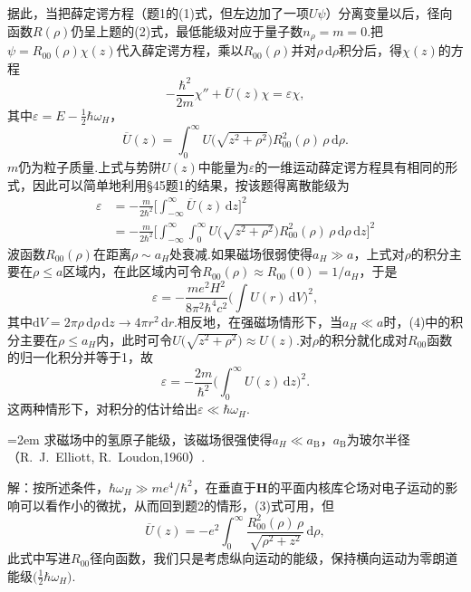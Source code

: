\begin{xiti}
据此，当把薛定谔方程（题1的(1)式，但左边加了一项$U\psi$）分离变量以后，径向函数$R(\rho)$仍呈上题的(2)式，最低能级对应于量子数$n_\rho=m=0$.把$\psi=R_{00}(\rho)\chi(z)$代入薛定谔方程，乘以$R_{00}(\rho)$并对$\rho\,\mathrm{d}\rho$积分后，得$\chi(z)$的方程
\begin{equation}
  -\frac{\hbar^2}{2m}\chi''+\overline{U}(z)\chi=\varepsilon\chi,
\end{equation}
其中$\varepsilon=E-\frac{1}{2}\hbar\omega_H$，
\begin{equation*}
  \overline{U}(z)=\int_0^{\infty}U\bigl(\sqrt{z^2+\rho^2}\bigr)R_{00}^2(\rho)\,\rho\,\mathrm{d}\rho.
\end{equation*}
$m$仍为粒子质量.上式与势阱$U(z)$中能量为$\varepsilon$的一维运动薛定谔方程具有相同的形式，因此可以简单地利用§45题1的结果，按该题得离散能级为
\begin{equation}
\begin{aligned}
  \varepsilon&=-\frac{m}{2\hbar^2}\biggl[\int_{-\infty}^{\infty}\overline{U}(z)\,\mathrm{d}z\biggr]^2\\
  &=-\frac{m}{2\hbar^2}\biggl[\int_{-\infty}^{\infty}\int_0^{\infty}
  U\bigl(\sqrt{z^2+\rho^2}\bigr)R_{00}^2(\rho)\,\rho\,\mathrm{d}\rho\,\mathrm{d}z\biggr]^2
\end{aligned}
\end{equation}
波函数$R_{00}(\rho)$在距离$\rho\sim a_H$处衰减.如果磁场很弱使得$a_H\gg a$，上式对$\rho$的积分主要在$\rho\leqslant a$区域内，在此区域内可令$R_{00}(\rho)\approx R_{00}(0)=1/a_H$，于是
\begin{equation}
  \varepsilon=-\frac{me^2H^2}{8\pi^2\hbar^4c^2}
  \biggl(\int U(r)\,\mathrm{d}V\biggr)^2,
\end{equation}
其中$\mathrm{d}V=2\pi\rho\,\mathrm{d}\rho\,\mathrm{d}z\to4\pi r^2\,\mathrm{d}r$.相反地，在强磁场情形下，当$a_H\ll a$时，(4)中的积分主要在$\rho\leqslant a_H$内，此时可令$U\bigl(\sqrt{z^2+\rho^2}\bigr)\approx U(z)$.对$\rho$的积分就化成对$R_{00}$函数的归一化积分并等于1，故
\begin{equation}
  \varepsilon=-\frac{2m}{\hbar^2}\biggl(\int_0^{\infty}U(z)\,\mathrm{d}z\biggr)^2.
\end{equation}
这两种情形下，对积分的估计给出$\varepsilon\ll\hbar\omega_H$.

\emergencystretch=2em%
\quad 求磁场中的氢原子能级，该磁场很强使得$a_H\ll a_\mathrm{B}$，$a_\mathrm{B}$为玻尔半径（R.~J.~Elliott, R.~Loudon,1960）.

解：按所述条件，$\hbar\omega_H\gg me^4/\hbar^2$，在垂直于$\boldsymbol{H}$的平面内核库仑场对电子运动的影响可以看作小的微扰，从而回到题2的情形，(3)式可用，但
\emergencystretch=0pt%
\begin{equation}
  \overline{U}(z)=-e^2\int_0^{\infty}\frac{R_{00}^2(\rho)\,\rho}{\sqrt{\rho^2+z^2}}\,\mathrm{d}\rho,
\end{equation}
此式中写进$R_{00}$径向函数，我们只是考虑纵向运动的能级，保持横向运动为零朗道能级$\bigl(\frac{1}{2}\hbar\omega_H\bigr)$.


\end{xiti}
